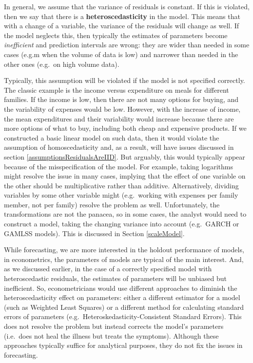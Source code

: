 \documentclass[
]{book}
\theoremstyle{definition}
\theoremstyle{definition}
\theoremstyle{definition}
\theoremstyle{definition}
\theoremstyle{remark}
\begin{document}
In general, we assume that the variance of residuals is constant. If this is violated, then we say that there is a \textbf{heteroscedasticity} in the model. This means that with a change of a variable, the variance of the residuals will change as well. If the model neglects this, then typically the estimates of parameters become \emph{inefficient} and prediction intervals are wrong: they are wider than needed in some cases (e.g.m when the volume of data is low) and narrower than needed in the other ones (e.g.~on high volume data).

Typically, this assumption will be violated if the model is not specified correctly. The classic example is the income versus expenditure on meals for different families. If the income is low, then there are not many options for buying, and the variability of expenses would be low. However, with the increase of income, the mean expenditures and their variability would increase because there are more options of what to buy, including both cheap and expensive products. If we constructed a basic linear model on such data, then it would violate the assumption of homoscedasticity and, as a result, will have issues discussed in section \ref{assumptionsResidualsAreIID}. But arguably, this would typically appear because of the misspecification of the model. For example, taking logarithms might resolve the issue in many cases, implying that the effect of one variable on the other should be multiplicative rather than additive. Alternatively, dividing variables by some other variable might (e.g.~working with expenses per family member, not per family) resolve the problem as well. Unfortunately, the transformations are not the panacea, so in some cases, the analyst would need to construct a model, taking the changing variance into account (e.g.~GARCH or GAMLSS models). This is discussed in Section \ref{scaleModel}.

While forecasting, we are more interested in the holdout performance of models, in econometrics, the parameters of models are typical of the main interest. And, as we discussed earlier, in the case of a correctly specified model with heteroscedastic residuals, the estimates of parameters will be unbiased but inefficient. So, econometricians would use different approaches to diminish the heteroscedasticity effect on parameters: either a different estimator for a model (such as Weighted Least Squares) or a different method for calculating standard errors of parameters (e.g.~Heteroskedasticity-Consistent Standard Errors). This does not resolve the problem but instead corrects the model's parameters (i.e.~does not heal the illness but treats the symptoms). Although these approaches typically suffice for analytical purposes, they do not fix the issues in forecasting.
\end{document}
